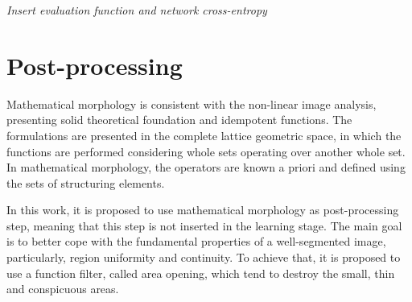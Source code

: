 %


\begin{center}
\textit{Insert evaluation function and network cross-entropy}
 \color{green}{As funcoes usadas foram categorical cross-entropy e ofuse pixel-error, retirada do artigo HED (eq. 1)}

\end{center}






\section{Post-processing}


Mathematical morphology is consistent with the non-linear image analysis, presenting solid theoretical foundation and idempotent functions. The formulations are presented in the complete lattice geometric space, in which the functions are performed considering whole sets operating over another whole set. In mathematical morphology, the operators are known a priori and defined using the sets of structuring elements.

In this work, it is proposed to use mathematical morphology as post-processing step, meaning that this step is not inserted in the learning stage. The main goal is to better cope with the fundamental properties of a well-segmented image, particularly, region uniformity and continuity. To achieve that, it is proposed to use a function filter, called area opening, which tend to destroy the small, thin and conspicuous areas.

